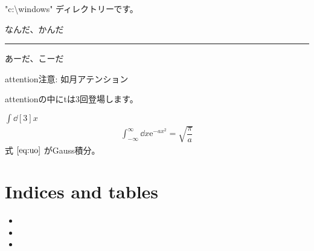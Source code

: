 \documentclass[letterpaper,10pt,dvipdfmx]{sphinxmanual}
\begin{document}
\sphinxAtStartPar
"c:\textbackslash{}windows" ディレクトリーです。

\sphinxAtStartPar
なんだ、かんだ


\bigskip\hrule\bigskip


\sphinxAtStartPar
あーだ、こーだ

\begin{sphinxadmonition}{attention}{注意:}
\sphinxAtStartPar
如月アテンション

\sphinxAtStartPar
attentionの中にtは3回登場します。
\end{sphinxadmonition}

\sphinxAtStartPar
\(\displaystyle\int\dd[3]{x}\)
\begin{align}
  \int_{-\infty}^\infty\dd{x}\mathrm{e}^{-ax^2} = \sqrt{\dfrac{\pi}{a}} \label{eq:uo}
\end{align}
\sphinxAtStartPar
式 \(\ref{eq:uo}\) がGauss積分。


\chapter{Indices and tables}
\label{\detokenize{index:indices-and-tables}}\begin{itemize}
\item {} 
\sphinxAtStartPar
{}

\item {} 
\sphinxAtStartPar
{}

\item {} 
\sphinxAtStartPar
{}

\end{itemize}



\renewcommand{\indexname}{索引}
\printindex
\end{document}

